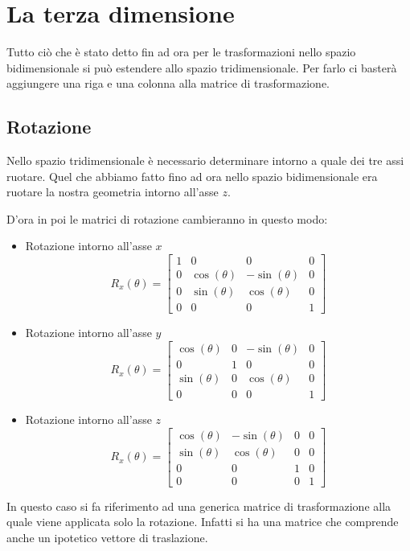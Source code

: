 \chapter{La terza dimensione}\label{3D}
Tutto ci\`o che \`e stato detto fin ad ora per le trasformazioni nello spazio bidimensionale si pu\`o estendere allo
spazio tridimensionale. Per farlo ci baster\`a aggiungere una riga e una colonna alla matrice di trasformazione.

\section{Rotazione}
Nello spazio tridimensionale \`e necessario determinare intorno a quale dei tre assi ruotare. Quel che abbiamo fatto
fino ad ora nello spazio bidimensionale era ruotare la nostra geometria intorno all'asse $z$.

D'ora in poi le matrici di rotazione cambieranno in questo modo:
\begin{itemize}
	\item Rotazione intorno all'asse $x$
	      \[
		      R_x(\theta) = \begin{bmatrix}
			      1 & 0            & 0             & 0 \\
			      0 & \cos(\theta) & -\sin(\theta) & 0 \\
			      0 & \sin(\theta) & \cos(\theta)  & 0 \\
			      0 & 0            & 0             & 1
		      \end{bmatrix}
	      \]
	\item Rotazione intorno all'asse $y$
	      \[
		      R_x(\theta) = \begin{bmatrix}
			      \cos(\theta) & 0 & -\sin(\theta) & 0 \\
			      0            & 1 & 0             & 0 \\
			      \sin(\theta) & 0 & \cos(\theta)  & 0 \\
			      0            & 0 & 0             & 1
		      \end{bmatrix}
	      \]
	\item Rotazione intorno all'asse $z$
	      \[
		      R_x(\theta) = \begin{bmatrix}
			      \cos(\theta) & -\sin(\theta) & 0 & 0 \\
			      \sin(\theta) & \cos(\theta)  & 0 & 0 \\
			      0            & 0             & 1 & 0 \\
			      0            & 0             & 0 & 1
		      \end{bmatrix}
	      \]
\end{itemize}
In questo caso si fa riferimento ad una generica matrice di trasformazione alla quale viene applicata solo la rotazione.
Infatti si ha una matrice che comprende anche un ipotetico vettore di traslazione.

